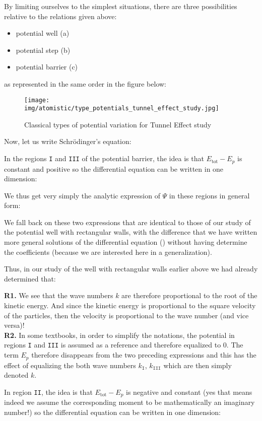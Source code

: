	By limiting ourselves to the simplest situations, there are three possibilities relative to the relations given above: 
	\begin{itemize}
		\item potential well (a)
		\item potential step (b)
		\item potential barrier (c)
	\end{itemize}
	as represented in the same order in the figure below:
	\begin{figure}[H]
		\centering
		\texttt{[image: img/atomistic/type\_potentials\_tunnel\_effect\_study.jpg]}	
		\caption{Classical types of potential variation for Tunnel Effect study}
	\end{figure}
	Now, let us write Schrödinger's equation:
	
	In the regions \texttt{I} and \texttt{III} of the potential barrier, the idea is that $E_{\text{tot}}-E_p$ is constant and positive so the differential equation can be written in one dimension:
	
	We thus get very simply the analytic expression of $\Psi$ in these regions in general form:
	
	We fall back on these two expressions that are identical to those of our study of the potential well with rectangular walls, with the difference that we have written more general solutions of the differential equation () without having determine the coefficients (because we are interested here in a generalization).

	Thus, in our study of the well with rectangular walls earlier above we had already determined that:
	
	\begin{tcolorbox}[title=Remarks,colframe=black,arc=10pt]
	\textbf{R1.} We see that the wave numbers $k$ are therefore proportional to the root of the kinetic energy. And since the kinetic energy is proportional to the square velocity of the particles, then the velocity is proportional to the wave number (and vice versa)!\\

	\textbf{R2.} In some textbooks, in order to simplify the notations, the potential in regions \texttt{I} and \texttt{III} is assumed as a reference and therefore equalized to $0$. The term $E_p$ therefore disappears from the two preceding expressions and this has the effect of equalizing the both wave numbers $k_{\texttt{I}}$, $k_{\texttt{III}}$ which are then simply denoted $k$.
	\end{tcolorbox}
	In region \texttt{II}, the idea is that $E_{\text{tot}}-E_p$ is negative and constant (yes that means indeed we assume the corresponding moment to be mathematically an imaginary number!) so the differential equation can be written in one dimension:
	
